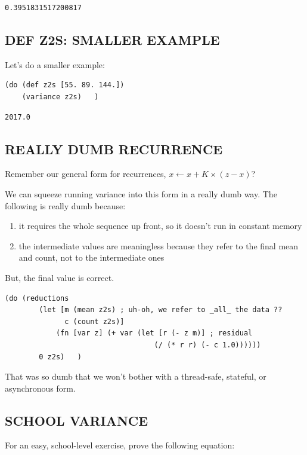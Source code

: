 \documentclass[10pt,oneside,x11names]{article}
\begin{document}
\begin{verbatim}
0.3951831517200817
\end{verbatim}

\subsection{DEF Z2S: SMALLER EXAMPLE}
\label{smaller-example}
Let's do a smaller example:

\begin{verbatim}
(do (def z2s [55. 89. 144.])
    (variance z2s)   )
\end{verbatim}

\begin{verbatim}
2017.0
\end{verbatim}

\subsection{REALLY DUMB RECURRENCE}
\label{really-dumb-recurrence}
Remember our general form for recurrences,
\(x\leftarrow{}x + K\times{}(z-x)\)?

We can squeeze running variance into this form in a really dumb way. The
following is really dumb because:

\begin{enumerate}
\item it requires the whole sequence up front, so it doesn't run in constant memory

\item the intermediate values are meaningless because they refer to the final mean
and count, not to the intermediate ones
\end{enumerate}

But, the final value is correct.

\begin{verbatim}
(do (reductions
        (let [m (mean z2s) ; uh-oh, we refer to _all_ the data ??
              c (count z2s)]
            (fn [var z] (+ var (let [r (- z m)] ; residual
                                   (/ (* r r) (- c 1.0))))))
        0 z2s)   )
\end{verbatim}

That was so dumb that we won't bother with a thread-safe,
stateful, or asynchronous form.

\subsection{SCHOOL VARIANCE}
\label{school-variance}
For an easy, school-level exercise, prove the following equation:
\end{document}
